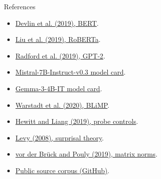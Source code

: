 \documentclass[aspectratio=169,11pt]{beamer}
\begin{document}
\begin{frame}{References}
\footnotesize
\begin{itemize}
  \item \href{https://aclanthology.org/N19-1423/}{Devlin et al. (2019), BERT}.
  \item \href{https://arxiv.org/abs/1907.11692}{Liu et al. (2019), RoBERTa}.
  \item \href{https://cdn.openai.com/better-language-models/language_models_are_unsupervised_multitask_learners.pdf}{Radford et al. (2019), GPT-2}.
  \item \href{https://huggingface.co/mistralai/Mistral-7B-Instruct-v0.3}{Mistral-7B-Instruct-v0.3 model card}.
  \item \href{https://huggingface.co/google/gemma-3-4b-it}{Gemma-3-4B-IT model card}.
  \item \href{https://aclanthology.org/2020.tacl-1.25/}{Warstadt et al. (2020), BLiMP}.
  \item \href{https://aclanthology.org/D19-1275/}{Hewitt and Liang (2019), probe controls}.
  \item \href{https://link.springer.com/article/10.1007/s10988-008-9031-0}{Levy (2008), surprisal theory}.
  \item \href{https://aclanthology.org/N19-1181/}{vor der Br\"uck and Pouly (2019), matrix norms}.
  \item \href{https://github.com/text-machine-lab/extending_psycholinguistic_dataset}{Public source corpus (GitHub)}.
\end{itemize}
\end{frame}
\end{document}
